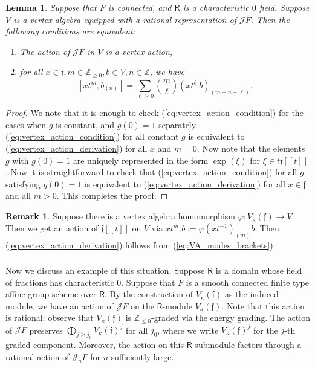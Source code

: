 \documentclass{amsart}
\newtheorem{Lem}[Thm]{Lemma}
\theoremstyle{definition}
\newtheorem{Rem}[Thm]{Remark}
\newcommand{\sss}{\subsubsection{}}
\newcommand{\Ring}{\mathsf{R}}
\newcommand{\Z}{\mathbb{Z}}
\newcommand{\Jet}{\mathscr{J}}
\newcommand{\ff}{\mathfrak{f}}
\numberwithin{equation}{section}
\begin{document}
\begin{Lem}\label{Lem:vertex_action_Lie_algebra}
Suppose that $F$ is connected, and $\Ring$ is a characteristic $0$ field. Suppose $V$ is a vertex algebra equipped with a rational representation of $\Jet F$. Then the following conditions are equivalent:
\begin{enumerate}
\item The action of $\Jet F$ in $V$ is a vertex action,
\item for all $x\in \mathfrak{f},m\in \Z_{\geqslant 0}, b\in V, n\in \Z$, we have 
\begin{equation}\label{eq:vertex_action_derivation}
[xt^m,b_{(n)}]=\sum_{\ell\geqslant 0}{m\choose \ell}(xt^\ell.b)_{(m+n-\ell)}.
\end{equation}
\end{enumerate}
\end{Lem}
\begin{proof}
We note that it is enough to check (\ref{eq:vertex_action_condition}) for the cases when $g$ is constant, and $g(0)=1$ separately. (\ref{eq:vertex_action_condition}) for all constant $g$ is equivalent to (\ref{eq:vertex_action_derivation}) for all $x$ and $m=0$. Now note that the elements $g$ with $g(0)=1$ are uniquely represented in the form $\operatorname{exp}(\xi)$ for $\xi\in t\mathfrak{f}[[t]]$. Now it is straightforward to check that (\ref{eq:vertex_action_condition}) for all $g$ satisfying $g(0)=1$ is equivalent to
(\ref{eq:vertex_action_derivation}) for all $x\in \ff$ and all $m>0$. This completes the proof. 
\end{proof}

\begin{Rem}\label{Rem:inner_Lie_algebra_action}
Suppose there is a vertex algebra homomorphism $\varphi:V_\kappa(\mathfrak{f})\rightarrow V$. Then we get an action of $\mathfrak{f}[[t]]$ on $V$ via $xt^m.b:=\varphi(xt^{-1})_{(m)}b$. Then (\ref{eq:vertex_action_derivation}) follows from 
(\ref{eq:VA_modes_brackets}).
\end{Rem}

\sss 
Now we discuss an example of this situation.
Suppose $\Ring$ is a domain whose field of fractions has characteristic $0$.
Suppose that $F$ is a smooth connected finite type affine group scheme over $\Ring$.
By the construction of $V_\kappa(\mathfrak{f})$ as the induced module, we have an action of $\Jet F$ on the $\Ring$-module $V_\kappa(\mathfrak{f})$. Note that this action is rational: observe that $V_\kappa(\mathfrak{f})$ is $\Z_{\leqslant 0}$-graded via the energy grading. The action of $\Jet F$ preserves $\bigoplus_{j\geqslant j_0}V_\kappa(\mathfrak{f})^j$ for all $j_0$, where we write $V_\kappa(\mathfrak{f})^j$ for the $j$-th graded component. Moreover,  the action on this $\Ring$-submodule factors through a rational action of $\Jet_n F$ for $n$ sufficiently large. 
\end{document}
